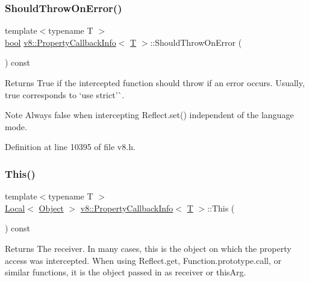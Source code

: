 \subsubsection{\texorpdfstring{Should\+Throw\+On\+Error()}{ShouldThrowOnError()}}
{\footnotesize\ttfamily template$<$typename T $>$ \\
\mbox{\hyperlink{classbool}{bool}} \mbox{\hyperlink{classv8_1_1PropertyCallbackInfo}{v8\+::\+Property\+Callback\+Info}}$<$ \mbox{\hyperlink{classv8_1_1internal_1_1torque_1_1T}{T}} $>$\+::Should\+Throw\+On\+Error (\begin{DoxyParamCaption}{ }\end{DoxyParamCaption}) const}

\begin{DoxyReturn}{Returns}
True if the intercepted function should throw if an error occurs. Usually, {\ttfamily true} corresponds to `\textquotesingle{}use strict'\`{}.
\end{DoxyReturn}
\begin{DoxyNote}{Note}
Always {\ttfamily false} when intercepting {\ttfamily Reflect.\+set()} independent of the language mode. 
\end{DoxyNote}


Definition at line 10395 of file v8.\+h.

\mbox{\label{classv8_1_1PropertyCallbackInfo_af46300339d2f31d8dc84a06d74ed6c3c}} 
\subsubsection{\texorpdfstring{This()}{This()}}
{\footnotesize\ttfamily template$<$typename T $>$ \\
\mbox{\hyperlink{classv8_1_1Local}{Local}}$<$ \mbox{\hyperlink{classv8_1_1Object}{Object}} $>$ \mbox{\hyperlink{classv8_1_1PropertyCallbackInfo}{v8\+::\+Property\+Callback\+Info}}$<$ \mbox{\hyperlink{classv8_1_1internal_1_1torque_1_1T}{T}} $>$\+::This (\begin{DoxyParamCaption}{ }\end{DoxyParamCaption}) const}

\begin{DoxyReturn}{Returns}
The receiver. In many cases, this is the object on which the property access was intercepted. When using {\ttfamily Reflect.\+get}, {\ttfamily Function.\+prototype.\+call}, or similar functions, it is the object passed in as receiver or this\+Arg.
\end{DoxyReturn}

